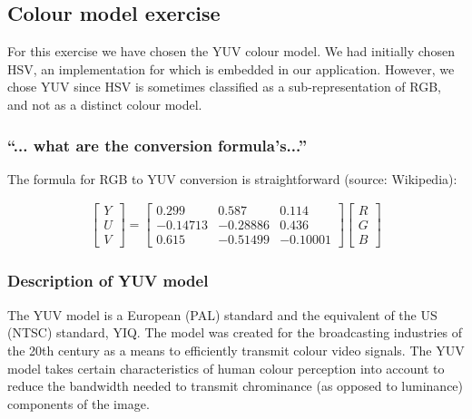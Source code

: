 \documentclass[abstract=true]{scrartcl}
\begin{document}
    \subsection{Colour model exercise}

        For this exercise we have chosen the YUV colour model. We had initially
        chosen HSV, an implementation for which is embedded in our application.
        However, we chose YUV since HSV is sometimes classified as a
        sub-representation of RGB, and not as a distinct colour model.

        \subsubsection{``... what are the conversion formula's...''}
        
            The formula for RGB to YUV conversion is straightforward (source:
            Wikipedia):

            \begin{eqnarray}
                \begin{bmatrix} Y \\ U \\ V \end{bmatrix} = 
                \begin{bmatrix} 
                    0.299 & 0.587 & 0.114 \\
                    -0.14713 & -0.28886 & 0.436 \\
                    0.615 & -0.51499 & -0.10001 
                \end{bmatrix}
                \begin{bmatrix} R \\ G \\ B \end{bmatrix}
            \end{eqnarray}

        \subsubsection{Description of YUV model}

            The YUV model is a European (PAL) standard and the equivalent of the
            US (NTSC) standard, YIQ. The model was created for the broadcasting
            industries of the 20th century as a means to efficiently transmit
            colour video signals. The YUV model takes certain characteristics of
            human colour perception into account to reduce the bandwidth needed
            to transmit chrominance (as opposed to luminance) components of the
            image.
\end{document}
